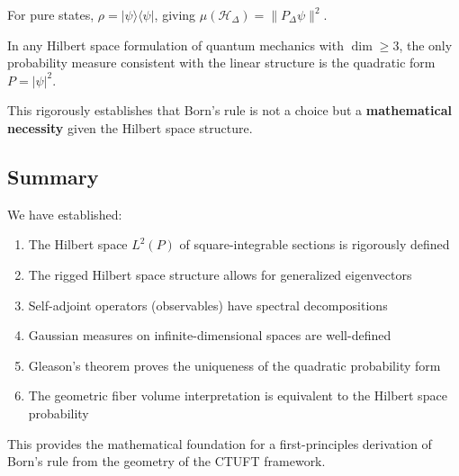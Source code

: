 For pure states, $\rho = |\psi\rangle\langle\psi|$, giving $\mu(\mathcal{H}_\Delta) = \|P_\Delta\psi\|^2$.

\begin{corollary}
In any Hilbert space formulation of quantum mechanics with $\dim \geq 3$, the only probability measure consistent with the linear structure is the quadratic form $P = |\psi|^2$.
\end{corollary}

This rigorously establishes that Born's rule is not a choice but a \textbf{mathematical necessity} given the Hilbert space structure.

\subsection{Summary}

We have established:
\begin{enumerate}
    \item The Hilbert space $L^2(P)$ of square-integrable sections is rigorously defined
    \item The rigged Hilbert space structure allows for generalized eigenvectors
    \item Self-adjoint operators (observables) have spectral decompositions
    \item Gaussian measures on infinite-dimensional spaces are well-defined
    \item Gleason's theorem proves the uniqueness of the quadratic probability form
    \item The geometric fiber volume interpretation is equivalent to the Hilbert space probability
\end{enumerate}

This provides the mathematical foundation for a first-principles derivation of Born's rule from the geometry of the CTUFT framework.

